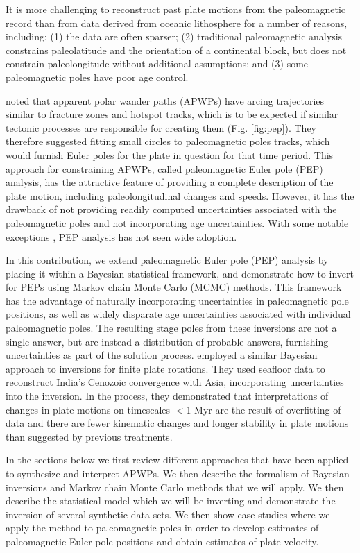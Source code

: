 \documentclass[11pt,letterpaper]{article}
\begin{document}
It is more challenging to reconstruct past plate motions from the paleomagnetic record than from data derived from oceanic lithosphere for a number of reasons, including: (1) the data are often sparser; (2) traditional paleomagnetic analysis constrains paleolatitude and the orientation of a continental block, but does not constrain paleolongitude without additional assumptions; and (3) some paleomagnetic poles have poor age control.

\cite{Gordon1984a} noted that apparent polar wander paths (APWPs) have arcing trajectories similar to fracture zones and hotspot tracks, which is to be expected if similar tectonic processes are responsible for creating them (Fig. \ref{fig:pep}). They therefore suggested fitting small circles to paleomagnetic poles tracks, which would furnish Euler poles for the plate in question for that time period. This approach for constraining APWPs, called paleomagnetic Euler pole (PEP) analysis, has the attractive feature of providing a complete description of the plate motion, including paleolongitudinal changes and speeds. However, it has the drawback of not providing readily computed uncertainties associated with the paleomagnetic poles and not incorporating age uncertainties. With some notable exceptions \citep[e.g.][]{Bryan1986a, Beck1989a, Tarling1996a, Beck2003a, Smirnov2010a}, PEP analysis has not seen wide adoption.

In this contribution, we extend paleomagnetic Euler pole (PEP) analysis by placing it within a Bayesian statistical framework, and demonstrate how to invert for PEPs using Markov chain Monte Carlo (MCMC) methods. This framework has the advantage of naturally incorporating uncertainties in paleomagnetic pole positions, as well as widely disparate age uncertainties associated with individual paleomagnetic poles. The resulting stage poles from these inversions are not a single answer, but are instead a distribution of probable answers, furnishing uncertainties as part of the solution process. \cite{Iaffaldano2012a} employed a similar Bayesian approach to inversions for finite plate rotations. They used seafloor data to reconstruct India's Cenozoic convergence with Asia, incorporating uncertainties into the inversion. In the process, they demonstrated that interpretations of changes in plate motions on timescales $<$1 Myr are the result of overfitting of data and there are fewer kinematic changes and longer stability in plate motions than suggested by previous treatments.

In the sections below we first review different approaches that have been applied to synthesize and interpret APWPs. We then describe the formalism of Bayesian inversions and Markov chain Monte Carlo methods that we will apply. We then describe the statistical model which we will be inverting and demonstrate the inversion of several synthetic data sets. We then show case studies where we apply the method to paleomagnetic poles in order to develop estimates of paleomagnetic Euler pole positions and obtain estimates of plate velocity.
\end{document}
